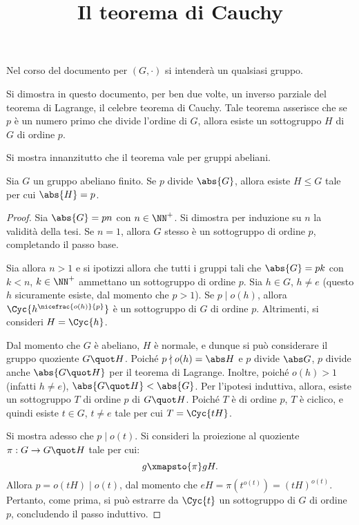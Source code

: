 \documentclass[12pt]{scrartcl}
\begin{document}
	\title{Il teorema di Cauchy}
	\maketitle
	
	\begin{note}
		Nel corso del documento per $(G, \cdot)$ si intenderà un qualsiasi gruppo.
	\end{note}
	
	Si dimostra in questo documento, per ben due volte, un inverso parziale
	del teorema di Lagrange, il celebre teorema di Cauchy. Tale teorema
	asserisce che se $p$ è un numero primo che divide l'ordine di $G$,
	allora esiste un sottogruppo $H$ di $G$ di ordine $p$. \medskip
	
	
	Si mostra innanzitutto che il teorema vale per gruppi abeliani.
	
	\begin{theorem}
		Sia $G$ un gruppo abeliano finito. Se $p$ divide $\abs{G}$, allora
		esiste $H \leq G$ tale per cui $\abs{H} = p$.
	\end{theorem}
	
	\begin{proof}
		Sia $\abs{G} = pn$ con $n \in \NN^+$. Si dimostra per induzione su $n$ la
		validità della tesi. Se $n = 1$, allora $G$ stesso è un sottogruppo di ordine $p$, completando il passo base. \medskip
		
		
		Sia allora $n > 1$ e si ipotizzi allora che tutti i gruppi tali che $\abs{G} = pk$ con $k < n$, $k \in \NN^+$ ammettano un sottogruppo di ordine $p$. Sia $h \in G$, $h \neq e$ (questo $h$ sicuramente esiste, dal momento che $p > 1$). Se $p \mid o(h)$, allora
		$\Cyc{h^{\nicefrac{o(h)}{p}}}$ è un sottogruppo di $G$ di ordine $p$. Altrimenti,
		si consideri $H = \Cyc{h}$. \medskip
		
		
		Dal momento che $G$ è abeliano, $H$ è normale, e dunque si può considerare il gruppo quoziente $G \quot H$. Poiché $p \nmid o(h) = \abs H$ e $p$ divide $\abs G$,
		$p$ divide anche $\abs{G \quot H}$ per il teorema di Lagrange. Inoltre, poiché
		$o(h) > 1$ (infatti $h \neq e$), $\abs{G \quot H} < \abs{G}$. Per l'ipotesi
		induttiva, allora, esiste un sottogruppo $T$ di ordine $p$ di $G \quot H$. Poiché
		$T$ è di ordine $p$, $T$ è ciclico, e quindi esiste $t \in G$, $t \neq e$ tale per cui
		$T = \Cyc{tH}$. \medskip
		
		
		Si mostra adesso che $p \mid o(t)$. Si consideri la proiezione al quoziente $\pi : G \to G \quot H$ tale per cui:
		\[ g \xmapsto{\pi} gH. \]
		Allora $p = o(tH) \mid o(t)$, dal momento che $eH=\pi(t^{o(t)})=(tH)^{o(t)}$.
		Pertanto, come prima, si può estrarre da $\Cyc{t}$ un sottogruppo di $G$
		di ordine $p$, concludendo il passo induttivo.
	\end{proof} \bigskip
	
\end{document}
